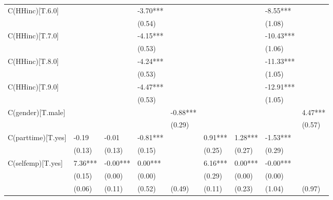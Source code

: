 \begin{table}[ht]
\begin{adjustbox}{width={15cm},totalheight={20cm}}
\begin{threeparttable}
\begin{tabular}{lllllllll}
C(HHinc)[T.6.0]    &           &            &    -3.70*** &              &            &             &     -8.55*** &               \\
                   &           &            &      (0.54) &              &            &             &       (1.08) &               \\
C(HHinc)[T.7.0]    &           &            &    -4.15*** &              &            &             &    -10.43*** &               \\
                   &           &            &      (0.53) &              &            &             &       (1.06) &               \\
C(HHinc)[T.8.0]    &           &            &    -4.24*** &              &            &             &    -11.33*** &               \\
                   &           &            &      (0.53) &              &            &             &       (1.05) &               \\
C(HHinc)[T.9.0]    &           &            &    -4.47*** &              &            &             &    -12.91*** &               \\
                   &           &            &      (0.53) &              &            &             &       (1.05) &               \\
C(gender)[T.male]  &           &            &             &     -0.88*** &            &             &              &       4.47*** \\
                   &           &            &             &       (0.29) &            &             &              &        (0.57) \\
C(parttime)[T.yes] &     -0.19 &      -0.01 &    -0.81*** &              &    0.91*** &     1.28*** &     -1.53*** &               \\
                   &    (0.13) &     (0.13) &      (0.15) &              &     (0.25) &      (0.27) &       (0.29) &               \\
C(selfemp)[T.yes]  &   7.36*** &   -0.00*** &     0.00*** &              &    6.16*** &     0.00*** &     -0.00*** &               \\
                   &    (0.15) &     (0.00) &      (0.00) &              &     (0.29) &      (0.00) &       (0.00) &               \\
                   &    (0.06) &     (0.11) &      (0.52) &       (0.49) &     (0.11) &      (0.23) &       (1.04) &        (0.97) \\

\end{tabular}
\end{threeparttable}
\end{adjustbox}
\end{table}

